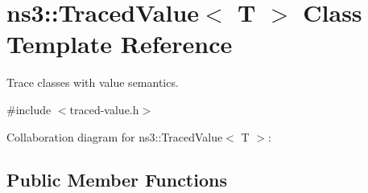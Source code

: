 \hypertarget{classns3_1_1TracedValue}{}\section{ns3\+:\+:Traced\+Value$<$ T $>$ Class Template Reference}
\label{classns3_1_1TracedValue}


Trace classes with value semantics.  




{\ttfamily \#include $<$traced-\/value.\+h$>$}



Collaboration diagram for ns3\+:\+:Traced\+Value$<$ T $>$\+:
\subsection*{Public Member Functions}
